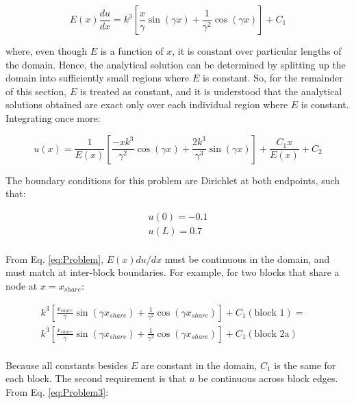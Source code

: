 \documentclass[10pt]{article}
\begin{document}
\begin{equation}
\label{eq:Problem2}
E(x)\frac{du}{dx}=k^3\left\lbrack \frac{x}{\gamma}\sin{(\gamma x)}+\frac{1}{\gamma^2}\cos{(\gamma x)}\right\rbrack+C_1
\end{equation}

where, even though \(E\) is a function of \(x\), it is constant over particular lengths of the domain. Hence, the analytical solution can be determined by splitting up the domain into sufficiently small regions where \(E\) is constant. So, for the remainder of this section, \(E\) is treated as constant, and it is understood that the analytical solutions obtained are exact only over each individual region where \(E\) is constant. Integrating once more:

\begin{equation}
\label{eq:Problem3}
u(x)=\frac{1}{E(x)}\left\lbrack\frac{-xk^3}{\gamma^2}\cos{(\gamma x)}+\frac{2k^3}{\gamma^3}\sin{(\gamma x)}\right\rbrack+\frac{C_1x}{E(x)}+C_2
\end{equation}

The boundary conditions for this problem are Dirichlet at both endpoints, such that:

\begin{equation}
\begin{aligned}
u(0)=-0.1\\
u(L)=0.7\\
\end{aligned}
\end{equation}

From Eq. \eqref{eq:Problem}, \(E(x)du/dx\) must be continuous in the domain, and must match at inter-block boundaries. For example, for two blocks that share a node at \(x=x_{share}\):

\begin{equation}
\begin{aligned}
k^3\left\lbrack \frac{x_{share}}{\gamma}\sin{(\gamma x_{share})}+\frac{1}{\gamma^2}\cos{(\gamma x_{share})}\right\rbrack+C_1(\text{block 1})=\quad\\
k^3\left\lbrack \frac{x_{share}}{\gamma}\sin{(\gamma x_{share})}+\frac{1}{\gamma^2}\cos{(\gamma x_{share})}\right\rbrack+C_1(\text{block 2a})\\
\end{aligned}
\end{equation}

Because all constants besides \(E\) are constant in the domain, \(C_1\) is the same for each block. The second requirement is that \(u\) be continuous across block edges. From Eq. \eqref{eq:Problem3}:
\end{document}
